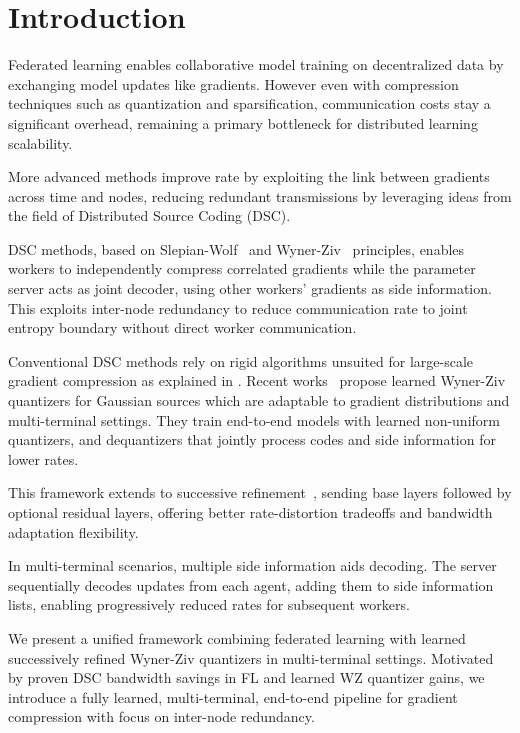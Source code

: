 \section{\textbf{Introduction}}
\label{sec:intro}

Federated learning enables collaborative model training on decentralized data by exchanging model updates like gradients. However even with compression techniques such as quantization and sparsification, communication costs stay a significant overhead, remaining a primary bottleneck for distributed learning scalability.

More advanced methods improve rate by exploiting the link between gradients across time and nodes, reducing redundant transmissions by leveraging ideas from the field of Distributed Source Coding (DSC).


DSC methods, based on Slepian-Wolf~\cite{SlepianWolf1973} and Wyner-Ziv~\cite{WynerZiv1976} principles, enables workers to independently compress correlated gradients while the parameter server acts as joint decoder, using other workers' gradients as side information. This exploits inter-node redundancy to reduce communication rate to joint entropy boundary without direct worker communication.

Conventional DSC methods rely on rigid algorithms unsuited for large-scale gradient compression as explained in . Recent works~\cite{OzywzRecoverBinning} propose learned Wyner-Ziv quantizers for Gaussian sources which are adaptable to gradient distributions and multi-terminal settings. They train end-to-end models with learned non-uniform quantizers, and dequantizers that jointly process codes and side information for lower rates.

This framework extends to successive refinement~\cite{BorisLayeredWZ}, sending base layers followed by optional residual layers, offering better rate-distortion tradeoffs and bandwidth adaptation flexibility.

In multi-terminal scenarios, multiple side information aids decoding. The server sequentially decodes updates from each agent, adding them to side information lists, enabling progressively reduced rates for subsequent workers.

We present a unified framework combining federated learning with learned successively refined Wyner-Ziv quantizers in multi-terminal settings. Motivated by proven DSC bandwidth savings in FL \cite{ZhangTao2022, Abrahamyan2022LGC} and learned WZ quantizer gains, we introduce a fully learned, multi-terminal, end-to-end pipeline for gradient compression with focus on inter-node redundancy.

